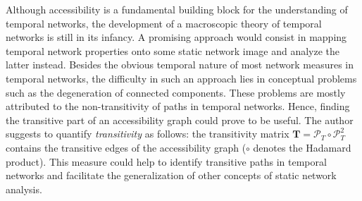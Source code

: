 Although accessibility is a fundamental building block for the understanding of temporal networks, the development of a macroscopic theory of temporal networks is still in its infancy.
A promising approach would consist in mapping temporal network properties onto some static network image and analyze the latter instead.
Besides the obvious temporal nature of most network measures in temporal networks, the difficulty in such an approach lies in conceptual problems such as the degeneration of connected components.
These problems are mostly attributed to the non-transitivity of paths in temporal networks.
Hence, finding the transitive part of an accessibility graph could prove to be useful.
The author suggests to quantify \emph{transitivity} as follows: the transitivity matrix $\mathbf{T}=\mathcal{P}_T\circ \mathcal{P}_T ^2$ contains the transitive edges of the accessibility graph ($\circ $ denotes the Hadamard product).
This measure could help to identify transitive paths in temporal networks and facilitate the generalization of other concepts of static network analysis.





